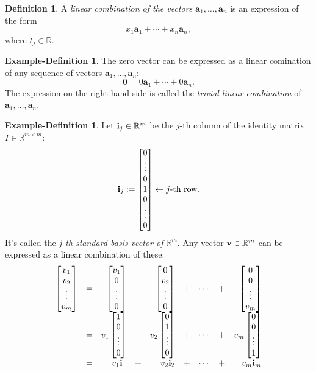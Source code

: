 \documentclass[12pt]{amsart}
\newcommand{\RR}{\mathbb{R}} \DeclareMathOperator{\rref}{rref}
\theoremstyle{definition} \newtheorem{definition}[theorem]{Definition}
\newtheorem{exdef}[theorem]{Example-Definition}
\newcommand{\ba}{\mathbf{a}} \newcommand{\bb}{\mathbf{b}}
\newcommand{\bzero}{\mathbf{0}}
\newcommand{\bas}{\ba_1,\ldots,\ba_n}
\newcommand{\mat}[1]{\begin{bmatrix}#1\end{bmatrix}}
\begin{document}
\begin{definition}\label{df:lc}
  A \emph{linear combination of the vectors $\bas$} is an expression of the form
  \[ x_1\ba_1+\cdots +x_n\ba_n, \]
  where $t_j\in \RR$.
\end{definition}

\begin{exdef}\label{exdef:trivial_lc}
  The zero vector can be expressed as a	linear comination of any sequence of vectors $\bas$:
  \[ \bzero = 0\ba_1+ \cdots + 0\ba_n.  \]
  The expression on the right hand side is called the \emph{trivial linear combination} of $\bas$.
\end{exdef}

\begin{exdef}\label{exdef:standard_basis}
  Let $\bi_j\in\RR^m$ be the $j$-th column of the identity matrix $I\in\RR^{m\times m}$:
  \[
    \bi_j := \mat{0\\\vdots\\0\\1\\0\\\vdots\\0} \leftarrow \text{$j$-th row}.
  \]
  It's called the \emph{$j$-th standard basis vector of $\RR^m$}.
Any vector $\bv\in\RR^m$ can be expressed as a linear combination of these:
\[
  \begin{array}{rcrcrcccr}
    \mat{v_1\\v_2\\\vdots\\v_m} &=&
\mat{v_1\\0\\\vdots\\0} 
&+& \mat{0\\v_2\\\vdots\\0}
&+& \cdots
&+& \mat{0\\0\\\vdots\\v_m} \\
&=& v_1\mat{1\\0\\\vdots\\0} 
&+& v_2\mat{0\\1\\\vdots\\0}
&+& \cdots
&+& v_m\mat{0\\0\\\vdots\\1} \\
&=& v_1\bi_1 &+& v_2\bi_2 &+&  \cdots  &+& v_m\bi_m
  \end{array}
\]
\end{exdef}
\end{document}
